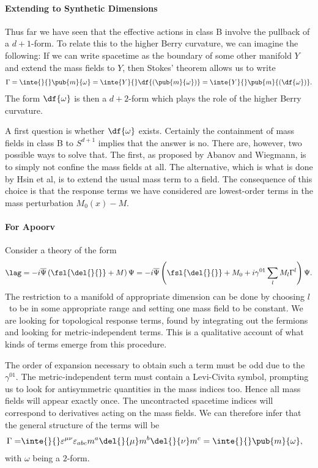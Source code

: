 \paragraph{Extending to Synthetic Dimensions}
Thus far we have seen that the effective actions in class B involve the pullback of a $d + 1$-form. To relate this to the higher Berry curvature, we can imagine the following: If we can write spacetime as the boundary of some other manifold $Y$ and extend the mass fields to $Y$, then Stokes' theorem allows us to write
\begin{align*}
	\Gamma = \inte{}{}\pub{m}{\omega} = \inte{Y}{}\df{(\pub{m}{\omega})} = \inte{Y}{}\pub{m}{(\df{\omega})}.
\end{align*}
The form $\df{\omega}$ is then a $d + 2$-form which plays the role of the higher Berry curvature.

A first question is whether $\df{\omega}$ exists. Certainly the containment of mass fields in class B to $S^{d + 1}$ implies that the answer is no. There are, however, two possible ways to solve that. The first, as proposed by Abanov and Wiegmann, is to simply not confine the mass fields at all. The alternative, which is what is done by Hsin et al, is to extend the usual mass term to a field. The consequence of this choice is that the response terms we have considered are lowest-order terms in the mass perturbation $M_{0}(x) - M$.

\paragraph{For Apoorv}
Consider a theory of the form
\begin{align*}
	\lag = -i\overline{\Psi}\left(\fsl{\del{}{}} + M\right)\Psi = -i\overline{\Psi}\left(\fsl{\del{}{}} + M_{0} + i\gamma^{01}\sum\limits_{l}M_{l}\Gamma^{l}\right)\Psi.
\end{align*}
The restriction to a manifold of appropriate dimension can be done by choosing $l$ to be in some appropriate range and setting one mass field to be constant. We are looking for topological response terms, found by integrating out the fermions and looking for metric-independent terms. This is a qualitative account of what kinds of terms emerge from this procedure.

The order of expansion necessary to obtain such a term must be odd due to the $\gamma^{01}$. The metric-independent term must contain a Levi-Civita symbol, prompting us to look for antisymmetric quantities in the mass indices too. Hence all mass fields will appear exactly once. The uncontracted spacetime indices will correspond to derivatives acting on the mass fields. We can therefore infer that the general structure of the terms will be
\begin{align*}
	\Gamma =& \inte{}{}\varepsilon^{\mu\nu}\varepsilon_{abc}m^{a}\del{}{\mu}m^{b}\del{}{\nu}m^{c} = \inte{}{}\pub{m}{\omega},
\end{align*}
with $\omega$ being a $2$-form.

